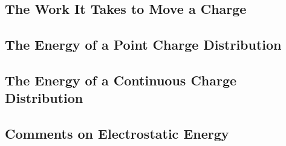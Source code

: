 \subsection{The Work It Takes to Move a Charge}

\subsection{The Energy of a Point Charge Distribution}

\subsection{The Energy of a Continuous Charge Distribution}

\subsection{Comments on Electrostatic Energy}